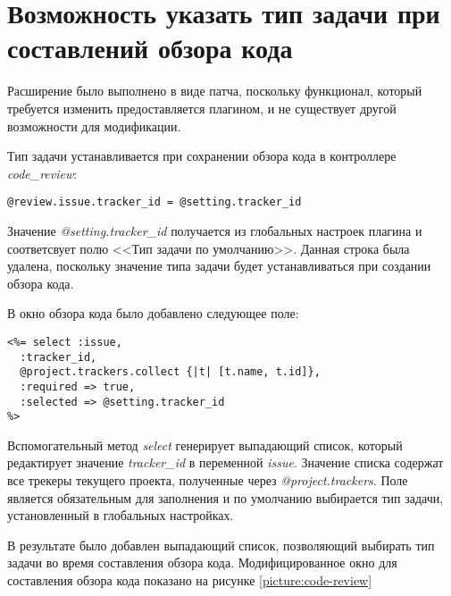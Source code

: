 \section{Возможность указать тип задачи при составлений обзора кода}
Расширение было выполнено в виде патча, поскольку функционал, который требуется
изменить предоставляется плагином, и не существует другой возможности для
модификации.

Тип задачи устанавливается при сохранении обзора кода в контроллере
\textit{code\_review}:
\small{\begin{lstlisting}
@review.issue.tracker_id = @setting.tracker_id
\end{lstlisting}}
Значение \textit{@setting.tracker\_id} получается из глобальных настроек
плагина и соответсвует полю <<Тип задачи по умолчанию>>. Данная строка была
удалена, поскольку значение типа задачи будет устанавливаться при создании
обзора кода.

В окно обзора кода было добавлено следующее поле:
\small{\begin{lstlisting}
<%= select :issue,
  :tracker_id,
  @project.trackers.collect {|t| [t.name, t.id]},
  :required => true, 
  :selected => @setting.tracker_id 
%>
\end{lstlisting}}
Вспомогательный метод \textit{select} генерирует выпадающий список, который
редактирует значение \textit{tracker\_id} в переменной \textit{issue}. Значение
списка содержат все трекеры текущего проекта, полученные через
\textit{@project.trackers}. Поле является обязательным для заполнения и по
умолчанию выбирается тип задачи, установленный в глобальных настройках.

В результате было добавлен выпадающий список, позволяющий выбирать тип задачи
во время составления обзора кода. Модифицированное окно для составления обзора
кода показано на рисунке \ref{picture:code-review}


